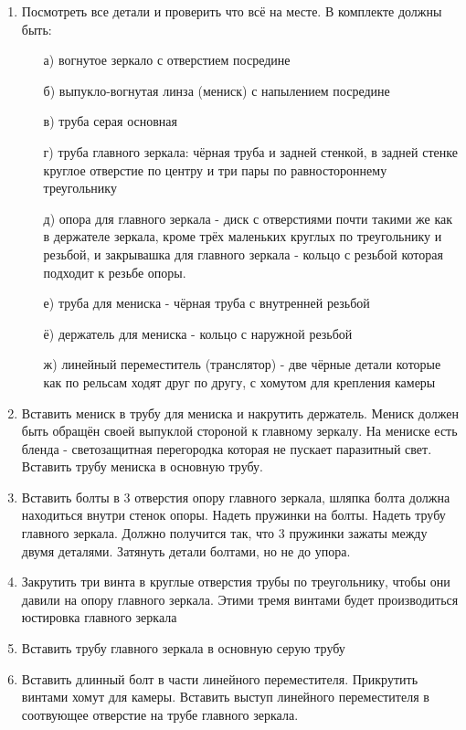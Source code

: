 \begin{enumerate}
    \item Посмотреть все детали и проверить что всё на месте. В комплекте должны быть:
    \begin{enumerate}
        \item[а)] вогнутое зеркало с отверстием посредине
        \item[б)] выпукло-вогнутая линза (мениск) с напылением посредине
        \item[в)] труба серая основная 
        \item[г)] труба главного зеркала: чёрная труба и задней стенкой, в задней стенке круглое отверстие по центру и три пары по равностороннему треугольнику
        \item[д)] опора для главного зеркала - диск с отверстиями почти такими же как в держателе зеркала, кроме трёх маленьких круглых по треугольнику и резьбой, и закрывашка для главного зеркала - кольцо с резьбой которая подходит к резьбе опоры.
        \item[е)] труба для мениска - чёрная труба с внутренней резьбой
        \item[ё)] держатель для мениска - кольцо с наружной резьбой
        \item[ж)] линейный переместитель (транслятор) - две чёрные детали которые как по рельсам ходят друг по другу, с хомутом для крепления камеры
    \end{enumerate}
    \item Вставить мениск в трубу для мениска и накрутить держатель. Мениск должен быть обращён своей выпуклой стороной к главному зеркалу. На мениске есть бленда - светозащитная перегородка которая не пускает паразитный свет. Вставить трубу мениска в основную трубу.
    \item Вставить болты в 3 отверстия опору главного зеркала, шляпка болта должна находиться внутри стенок опоры. Надеть пружинки на болты. Надеть трубу главного зеркала. Должно получится так, что 3 пружинки зажаты между двумя деталями. Затянуть детали болтами, но не до упора.
    \item Закрутить три винта в круглые отверстия трубы по треугольнику, чтобы они давили на опору главного зеркала. Этими тремя винтами будет производиться юстировка главного зеркала
    \item Вставить трубу главного зеркала в основную серую трубу 
    \item Вставить  длинный  болт в части линейного переместителя. Прикрутить винтами хомут для камеры. Вставить выступ линейного переместителя в соотвующее отверстие на трубе главного зеркала.
\end{enumerate}

